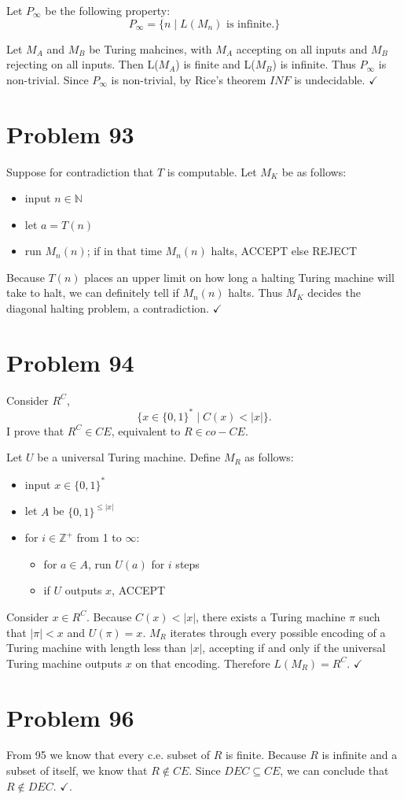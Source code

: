 \documentclass[11pt]{article}
\begin{document}
Let $P_\infty$ be the following property:
	\[ P_\infty = \{ n \mid L(M_n) \text{ is infinite}. \}\] 

Let $M_A$ and $M_B$ be Turing mahcines, with $M_A$ accepting on all inputs and $M_B$ rejecting on all inputs.
Then L($M_A$) is finite and L($M_B$) is infinite. 
Thus $P_\infty$ is non-trivial.
Since $P_\infty$ is non-trivial, by Rice's theorem $INF$ is undecidable. $\checkmark$



\section*{Problem 93}

Suppose for contradiction that $T$ is computable.
Let $M_K$ be as follows:
\begin{itemize}
	\item input $n \in \mathbb{N}$
	\item let $a = T(n)$
	\item run $M_n(n)$; if in that time $M_n(n)$ halts, ACCEPT else REJECT
\end{itemize}

Because $T(n)$ places an upper limit on how long a halting Turing machine will take to halt, we can definitely tell if $M_n(n)$ halts.
Thus $M_K$ decides the diagonal halting problem, a contradiction. $\checkmark$


\section*{Problem 94}

Consider $R^C$,
	\[ \{x \in \{0,1\}^* \mid C(x) < |x| \}. \]
I prove that $R^C \in CE$, equivalent to $R \in co-CE$.

Let $U$ be a universal Turing machine.
Define $M_R$ as follows:
\begin{itemize}
	\item input $x \in \{0,1\}^* $
	\item let $A$ be $\{0,1\}^{\leq |x|}$
	\item for $i \in \mathbb{Z}^+$ from 1 to $\infty$:
	\begin{itemize}
		\item for $a \in A$, run $U(a)$ for $i$ steps
		\item if $U$ outputs $x$, ACCEPT
	\end{itemize}
\end{itemize}

Consider $x \in R^C$.
Because $C(x) < |x|$, there exists a Turing machine $\pi$ such that $|\pi| < x$ and $U(\pi) = x$.
$M_R$ iterates through every possible encoding of a Turing machine with length less than $|x|$, accepting if and only if the universal Turing machine outputs $x$ on that encoding.
Therefore $L(M_R) = R^C$. $\checkmark$



\section*{Problem 96}

From 95 we know that every c.e. subset of $R$ is finite.
Because $R$ is infinite and a subset of itself, we know that $R \notin CE$.
Since $DEC \subseteq CE$, we can conclude that $R \notin DEC$. $\checkmark$.
\end{document}
